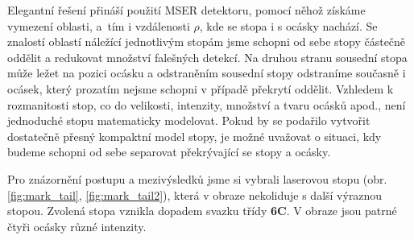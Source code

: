 	Elegantní řešení přináší použití MSER detektoru, pomocí něhož získáme vymezení oblasti, a~tím i vzdálenosti $\rho$, kde se stopa i s ocásky nachází. Se znalostí oblastí náležící jednotlivým stopám jsme schopni od sebe stopy částečně oddělit a redukovat množství falešných detekcí. Na druhou stranu sousední stopa může ležet na pozici ocásku a odstraněním sousední stopy odstraníme současně i ocásek, který prozatím nejsme schopni v případě překrytí oddělit. Vzhledem k rozmanitosti stop, co do velikosti, intenzity, množství a tvaru ocásků apod., není jednoduché stopu matematicky modelovat. Pokud by se podařilo vytvořit dostatečně přesný kompaktní model stopy, je možné uvažovat o situaci, kdy budeme schopni od sebe separovat překrývající se stopy a ocásky. 
	
 Pro znázornění postupu a mezivýsledků jsme si vybrali laserovou stopu (obr. \ref{fig:mark_tail}, \ref{fig:mark_tail2}), která v obraze nekoliduje s další výraznou stopou. Zvolená stopa vznikla dopadem svazku třídy \textbf{6C}. V obraze jsou patrné čtyři ocásky různé intenzity. 
	

